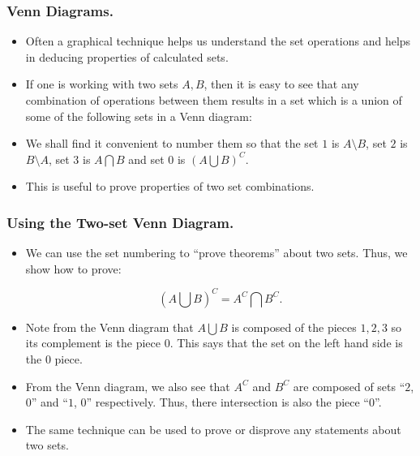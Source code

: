 %

\begin{frame}%
  \frametitle{Venn Diagrams.}
  \begin{itemize}%

\item Often a graphical technique helps us understand the set operations and
helps in deducing properties of calculated sets.

\item If one is working with two sets $A,B$,  then it is easy to see
that any combination of operations between them results in a set
which is a union of some of the following sets in a Venn diagram:
\centerline{}

\item We shall find it convenient to number them so that
the set $1$ is $A\setminus B$, set $2$ is $B\setminus A$, set $3$ is
$A\bigcap B$ and set $0$ is $(A \bigcup B)^C$.

\item This is useful to prove properties of two set combinations.


\end{itemize}
\pause
\end{frame}

%


\begin{frame}%
  \frametitle{Using the Two-set Venn Diagram.}
  \begin{itemize}%
 

\item
We can use the set numbering to ``prove theorems'' about two sets.
Thus, we show how to prove:

$$(A\bigcup B)^C = A^C \bigcap B^C.$$

\item Note from the Venn diagram that $A\bigcup B$ is composed of the pieces
$1,2,3$ so its complement is the piece $0$. This says that the set on
the left hand side is the $0$ piece.

\item From the Venn diagram, we also see that $A^C$ and $B^C$ are
composed of sets ``$2$, $0$'' and ``$1$, $0$'' respectively. Thus, there
intersection is also the piece ``$0$''.

\item The same technique can be used to prove or disprove any statements
about two sets.


\end{itemize}
\pause
\end{frame}

